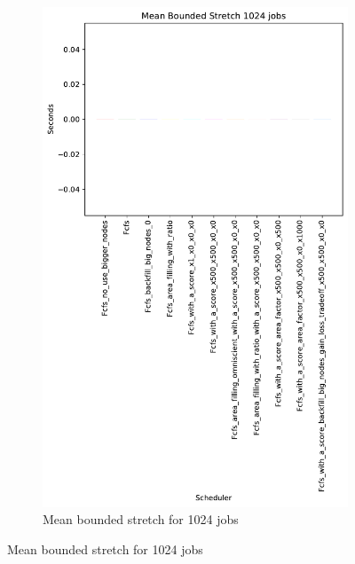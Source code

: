 \documentclass[a4paper]{article}
\begin{document}
\begin{figure}[H]
\begin{subfigure}[b]{0.4\linewidth}\centering\includegraphics[width=0.7\linewidth]{MBSS/plot/Results_Size_And_Data_2022-03-01->2022-03-03_V10000_Mean_Stretch_With_a_Minimum_1024_450_128_32_256_4_1024.pdf}\caption{Mean bounded stretch for 1024 jobs}\label{45}\end{subfigure}

\end{figure}
\end{document}

